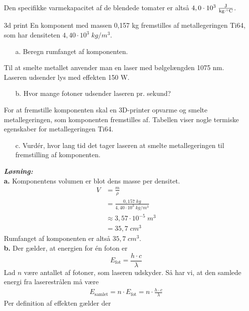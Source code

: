 \documentclass{report}
\newcommand{\sol}{\setlength{\parindent}{0cm}\textbf{\textit{Løsning:}}\setlength{\parindent}{1cm}}
\begin{document}
Den specifikke varmekapacitet af de blendede tomater er altså $4,0 \cdot 10^3 \;\unit{\frac{J}{kg \cdot \celsius}} $.
\begin{question}{3d print}{}
  En komponent med massen 0,157 kg fremstilles af metallegeringen Ti64, som har densiteten $4,40 \cdot 10^3 \;\unit{kg/m^3}$.
  \begin{itemize}
    \item[a.] Beregn rumfanget af komponenten.
  \end{itemize}
Til at smelte metallet anvender man en laser med bølgelængden 1075 nm. Laseren udsender lys med effekten 150 W.
\begin{itemize}
  \item[b.] Hvor mange fotoner udsender laseren pr. sekund?
\end{itemize}
For at fremstille komponenten skal en 3D-printer opvarme og smelte metallegeringen, som komponenten fremstilles af.
Tabellen viser nogle termiske egenskaber for metallegeringen Ti64.
\begin{itemize}
  \item[c.] Vurdér, hvor lang tid det tager laseren at smelte metallegeringen til fremstilling af komponenten.
\end{itemize}
\end{question}
\sol \\
\textbf{a.}
Komponentens volumen er blot dens masse per densitet.
\begin{equation*}
\begin{split}
V&=\frac{m}{\rho }\\
&=\frac{0,157 \;\unit{kg} }{4,40 \cdot 10^3 \;\unit{kg/m^3} }\\
&\approx 3,57 \cdot 10 ^{-5} \;\unit{m^3} \\
&=35,7 \;\unit{cm^3} 
\end{split}
\end{equation*}
Rumfanget af komponenten er altså $35,7 \;\unit{cm^3} $.\\[1ex]
\textbf{b.}
Der gælder, at energien for én foton er 
\[
E _{\text{fot} }=\frac{h \cdot c}{\lambda }
\] 
Lad $n$ være antallet af fotoner, som laseren udskyder.
Så har vi, at den samlede energi fra laserestrålen må være 
\begin{equation*}
\begin{split}
E _{\text{samlet} }= n \cdot E _{\text{fot} } = n \cdot \frac{h \cdot c}{\lambda }
\end{split}
\end{equation*}
Per definition af effekten gælder der
\end{document}
